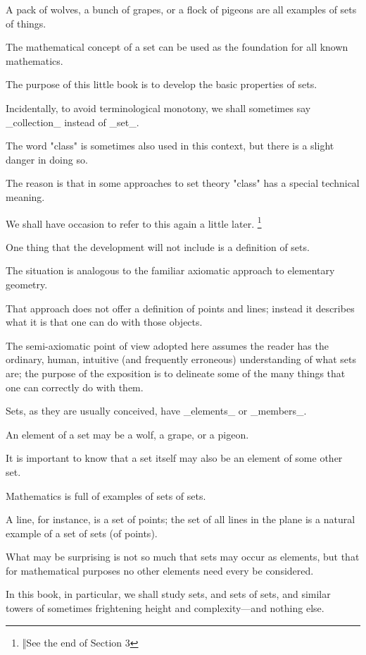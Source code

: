  A pack of wolves, a bunch of grapes, or a flock of pigeons are all examples of sets of things. 

The mathematical concept of a set can be used as the foundation for all known mathematics. 

The purpose of this little book is to develop the basic properties of sets. 

Incidentally, to avoid terminological monotony, we shall sometimes say _collection_ instead of _set_. 

The word "class" is sometimes also used in this context, but there is a slight danger in doing so. 

The reason is that in some approaches to set theory "class" has a special technical meaning. 

We shall have occasion to refer to this again a little later. \footnote{     ‖See the end of Section 3 
   }


One thing that the development will not include is a definition of sets. 

The situation is analogous to the familiar axiomatic approach to elementary geometry. 

That approach does not offer a definition of points and lines; instead it describes what it is that one can do with those objects. 

The semi-axiomatic point of view adopted here assumes the reader has the ordinary, human, intuitive (and frequently erroneous) understanding of what sets are; the purpose of the exposition is to delineate some of the many things that one can correctly do with them.


 Sets, as they are usually conceived, have _elements_ or _members_. 

An element of a set may be a wolf, a grape, or a pigeon. 

It is important to know that a set itself may also be an element of some other set. 

Mathematics is full of examples of sets of sets. 

A line, for instance, is a set of points; the set of all lines in the plane is a natural example of a set of sets (of points). 

What may be surprising is not so much that sets may occur as elements, but that for mathematical purposes no other elements need every be considered. 

In this book, in particular, we shall study sets, and sets of sets, and similar towers of sometimes frightening height and complexity---and nothing else. 

